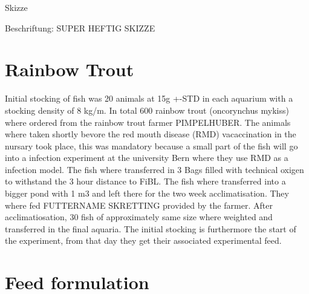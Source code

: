 Skizze

Beschriftung: SUPER HEFTIG SKIZZE

\section{Rainbow Trout}

Initial stocking of fish was 20 animals at 15g +-STD in each aquarium with
a stocking density of  8 kg/m. In total 600 rainbow trout (oncorynchus mykiss) where ordered from
the rainbow trout farmer PIMPELHUBER. The animals where taken shortly bevore
the red mouth disease (RMD) vacaccination in the nursary took place, this was mandatory because a 
small part of the fish will go into a infection experiment at the university Bern
where they use RMD as a infection model. The fish where transferred in 3 Bags
filled with technical oxigen to withstand the 3 hour distance to FiBL. The fish 
where transferred into a bigger pond with 1 m3 and left there for the two week
acclimatisation. They where fed FUTTERNAME SKRETTING provided by the farmer.
 After acclimatiosation, 30 fish of approximately same size where
weighted and transferred in the final aquaria. The initial stocking is furthermore
the start of the experiment, from that day they get their associated experimental feed.

\section{Feed formulation}

